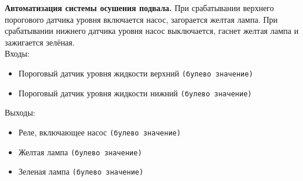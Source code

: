 \documentclass[a4paper]{article}
\begin{document}


\textbf{Автоматизация системы осушения подвала.} При срабатывании верхнего порогового датчика уровня включается насос, загорается желтая лампа. При срабатывании нижнего датчика уровня насос выключается, гаснет желтая лампа и зажигается зелёная.\\[0.5em]
Входы:
\begin{itemize}
    \item Пороговый датчик уровня жидкости верхний \verb|(булево значение)|
    \item Пороговый датчик уровня жидкости нижний \verb|(булево значение)|
\end{itemize}

Выходы:
\begin{itemize}
    \item Реле, включающее насос \verb|(булево значение)|
    \item Желтая лампа \verb|(булево значение)|
    \item Зеленая лампа \verb|(булево значение)|
\end{itemize}
\end{document}
